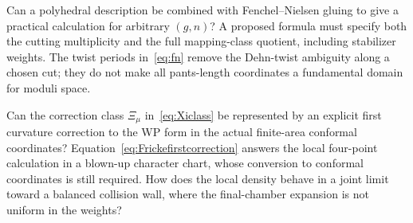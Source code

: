 \begin{question}
Can a polyhedral description be combined with Fenchel--Nielsen gluing to
give a practical calculation for arbitrary $(g,n)$? A proposed formula
must specify both the cutting multiplicity and the full mapping-class
quotient, including stabilizer weights. The twist periods in~\eqref{eq:fn}
remove the Dehn-twist ambiguity along a chosen cut; they do not make
all pants-length coordinates a fundamental domain for moduli space.
\end{question}

\begin{question}
Can the correction class $\Xi_\mu$ in~\eqref{eq:Xiclass} be represented
by an explicit first curvature correction to the WP form in
the actual finite-area conformal coordinates? Equation~\eqref{eq:Frickefirstcorrection}
answers the local four-point calculation in a blown-up character chart,
whose conversion to conformal coordinates is still required.
How does the local density behave
in a joint limit toward a balanced collision wall, where the
final-chamber expansion is not uniform in the weights?
\end{question}

